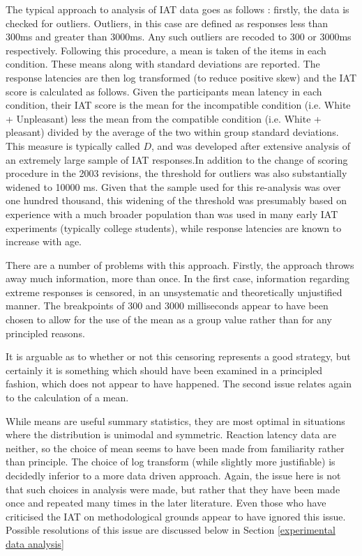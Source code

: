The typical approach to analysis of IAT data goes as follows  \cite{Greenwald1998}: firstly, the data is checked for outliers. Outliers, in this case are defined as responses less than 300ms and greater than 3000ms. Any such outliers are recoded to 300 or 3000ms respectively. Following this procedure, a mean is taken of the items in each condition. These means along with standard deviations are reported. The response latencies are then log transformed (to reduce positive skew) and the IAT score is calculated as follows. Given the participants mean latency in each condition, their IAT score is the mean for the incompatible condition (i.e. White + Unpleasant) less the mean from the compatible condition (i.e. White + pleasant) divided by the average of the two within group standard deviations. This measure is typically called $D$, and was developed after extensive analysis of an extremely large sample of IAT responses\cite{Greenwald2003a}.In addition to the change of scoring procedure in the 2003 revisions, the threshold for outliers was also substantially widened to 10000 ms. Given that the sample used for this re-analysis was over one hundred thousand, this widening of the threshold was presumably based on experience with a much broader population than was used in many early IAT experiments (typically college students), while response latencies are known to increase with age.

There are a number of problems with this approach. Firstly, the approach throws away much information, more than once. In the first case, information regarding extreme responses is censored, in an unsystematic and theoretically unjustified manner. The breakpoints of 300 and 3000 milliseconds appear to have been chosen to allow for the use of the mean as a group value rather than for any principled reasons. 

It is arguable as to whether or not this censoring represents a good strategy, but certainly it is something which should have been examined in a principled fashion, which does not appear to have happened. The second issue relates again to the calculation of a mean.

While means are useful summary statistics, they are most optimal in situations where the distribution is unimodal and symmetric\cite{venables2002modern}. Reaction latency data are neither, so the choice of mean seems to have been made from familiarity rather than principle. The choice of log transform (while slightly more justifiable) is decidedly inferior to a more data driven approach. Again, the issue here is not that such choices in analysis were made, but rather that they have been made once and repeated many times in the later literature. Even those who have criticised the IAT \cite{Klauer2005,Mierke2003,Blanton2006} on methodological grounds appear to have ignored this issue. Possible resolutions of this issue are discussed below in Section \ref{experimental data analysis}

